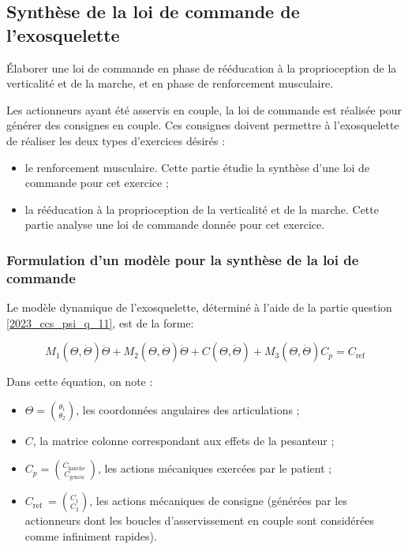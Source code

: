 \subsection{Synthèse de la loi de commande de l'exosquelette}
\begin{obj}
Élaborer une loi de commande en phase de rééducation à la proprioception de la verticalité et de la marche, et en phase de renforcement musculaire.
\end{obj}

\ifprof
\else
Les actionneurs ayant été asservis en couple, la loi de commande est réalisée pour générer des consignes en couple. Ces consignes doivent permettre à l'exosquelette de réaliser les deux types d'exercices désirés :

\begin{itemize}
  \item le renforcement musculaire. Cette partie étudie la synthèse d'une loi de commande pour cet exercice ;
  \item la rééducation à la proprioception de la verticalité et de la marche. Cette partie analyse une loi de commande donnée pour cet exercice.
\end{itemize}
\fi

\subsubsection{Formulation d'un modèle pour la synthèse de la loi de commande}


\ifprof
\else
Le modèle dynamique de l'exosquelette, déterminé à l'aide de la partie \label{2023_ccs_psi_p_2A} question \ref{2023_ccs_psi_q_11}, est de la forme:

$$
M_{1}(\Theta, \dot{\Theta}) \ddot{\Theta}+M_{2}(\Theta, \dot{\Theta}) \dot{\Theta}+C(\Theta, \dot{\Theta})+M_{3}(\Theta, \dot{\Theta}) C_{p}=C_{\mathrm{ref}}
$$

Dans cette équation, on note :

\begin{itemize}
  \item $\Theta=\binom{\theta_{1}}{\theta_{2}}$, les coordonnées angulaires des articulations ;
  \item $C$, la matrice colonne correspondant aux effets de la pesanteur ;
  \item $C_{p}=\binom{C_{\text {hanche }}}{C_{\text {genou }}}$, les actions mécaniques exercées par le patient ;
  \item $C_{\text {ref }}=\binom{C_{1}}{C_{2}}$, les actions mécaniques de consigne (générées par les actionneurs dont les boucles d'asservissement en couple sont considérées comme infiniment rapides).\\
\end{itemize}

